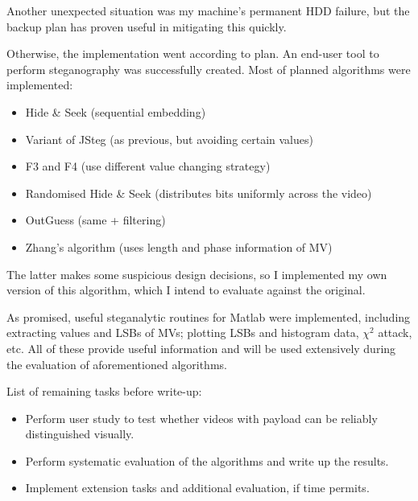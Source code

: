 \documentclass[11pt,british,usenames,dvipsnames,hypens,final]{scrartcl}
\numberwithin{equation}{section}
\numberwithin{figure}{section}
\begin{document}
Another unexpected situation was my machine's permanent HDD failure, but the backup plan has proven useful in mitigating this quickly. 

Otherwise, the implementation went according to plan. An end-user tool to perform steganography was successfully created. Most of planned algorithms were implemented: 
\begin{multicols}{2}
\begin{itemize}
\item Hide \& Seek (sequential embedding)
\item Variant of JSteg (as previous, but avoiding certain values)
\item F3 and F4 (use different value changing strategy)
\item Randomised Hide \& Seek (distributes bits uniformly across the video)
\item OutGuess (same + filtering)
\item Zhang's algorithm (uses length and phase information of MV)
\end{itemize}
\end{multicols}

The latter makes some suspicious design decisions, so I implemented my own version of this algorithm, which I intend to evaluate against the original. 

As promised, useful steganalytic routines for Matlab were implemented, including extracting values and LSBs of MVs; plotting LSBs and histogram data, $\chi^2$ attack, etc. All of these provide useful information and will be used extensively during the evaluation of aforementioned algorithms.

List of remaining tasks before write-up:
\begin{itemize}
\item Perform user study to test whether videos with payload can be reliably distinguished visually. 
\item Perform systematic evaluation of the algorithms and write up the results.
\item Implement extension tasks and additional evaluation, if time permits.
\end{itemize} 
\end{document}

